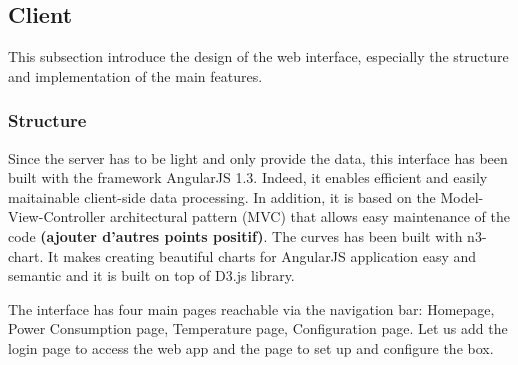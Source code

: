 \subsection{Client} %

This subsection introduce the design of the web interface, especially the structure and implementation of the main features.

\subsubsection{Structure}
    Since the server has to be light and only provide the data, this interface has been built with the framework AngularJS 1.3. Indeed, it enables efficient and easily maitainable client-side data processing. In addition, it is based on the Model-View-Controller architectural pattern (MVC) that allows easy maintenance of the code \textbf{(ajouter d'autres points positif)}. The curves has been built with n3-chart. It makes creating beautiful charts for AngularJS application easy and semantic and it is built on top of D3.js library.
    
    The interface has four main pages reachable via the navigation bar: Homepage, Power Consumption page, Temperature page, Configuration page. Let us add the login page to access the web app and the page to set up and configure the box.
     
    \begin{figure}[!h]
        \centering
    \end{figure}

